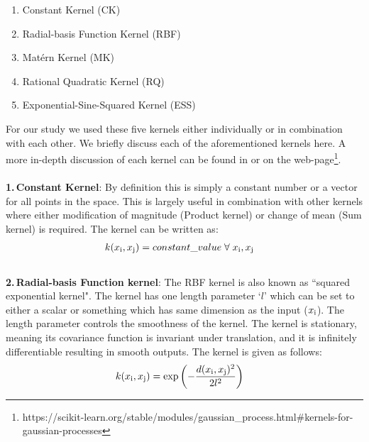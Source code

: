         \begin{enumerate}[]
            \item Constant Kernel (CK)
            \item Radial-basis Function Kernel (RBF)
            \item Mat\'ern Kernel (MK)
            \item Rational Quadratic Kernel (RQ)
            \item Exponential-Sine-Squared Kernel (ESS)
        \end{enumerate}
        For our study we used these five kernels either individually or in combination with each
        other. We briefly discuss each of the aforementioned kernels here. A more in-depth
        discussion of each kernel can be found in \citet{Rasmussen2006} or on the
        web-page\footnote{https://scikit-learn.org/stable/modules/gaussian\_process.html\#kernels-for-gaussian-processes}.\\
        \\
        \textbf{1.\,Constant Kernel}: By definition this is simply a constant number or a vector for
        all points in the space. This is largely useful in combination with other kernels where
        either modification of magnitude (Product kernel) or change of mean (Sum kernel) is
        required. The kernel can be written as:
        \begin{align}
            \begin{split}
                k(x_{\rm i},x_{\rm j}) & = constant\_value \;\forall\; x_{\rm i}, x_{\rm j} \label{eq:cst_ker}
            \end{split}
        \end{align}
        \\
        \textbf{2.\,Radial-basis Function kernel}: The RBF kernel is also known as ``squared
        exponential kernel". The kernel has one length parameter `$l$' which can be set to either a
        scalar or something which has same dimension as the input ($x_{\rm i}$). The length
        parameter controls the smoothness of the kernel. The kernel is stationary, meaning its
        covariance function is invariant under translation, and it is infinitely differentiable
        resulting in smooth outputs. The kernel is given as follows:
        \begin{align}
            \begin{split}
                k(x_{\rm i}, x_{\rm j}) & = \exp\left(- \frac{d(x_{\rm i}, x_{\rm j})^2}{2l^2} \right) \label{eq:rbf_ker}
            \end{split}
        \end{align}
